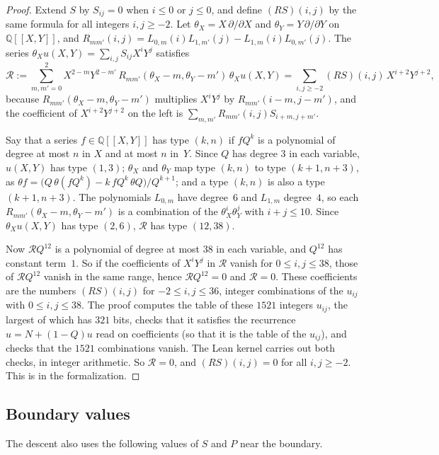 \documentclass[11pt]{amsart}
\theoremstyle{definition}
\numberwithin{equation}{section}
\newcommand{\Q}{\mathbb{Q}}
\begin{document}
\begin{proof}
Extend $S$ by $S_{ij}=0$ when $i\le0$ or $j\le0$, and define $(RS)(i,j)$ by the same formula for all integers $i,j\ge-2$. Let $\theta_X=X\,\partial/\partial X$ and $\theta_Y=Y\,\partial/\partial Y$ on $\Q[[X,Y]]$, and $R_{mm'}(i,j)=L_{0,m}(i)L_{1,m'}(j)-L_{1,m}(i)L_{0,m'}(j)$. The series $\theta_Xu(X,Y)=\sum_{i,j}S_{ij}X^iY^j$ satisfies
\[
\mathcal R:=\sum_{m,m'=0}^2X^{2-m}Y^{2-m'}\,R_{mm'}(\theta_X-m,\theta_Y-m')\,\theta_Xu(X,Y)=\sum_{i,j\ge-2}(RS)(i,j)\,X^{i+2}Y^{j+2},
\]
because $R_{mm'}(\theta_X-m,\theta_Y-m')$ multiplies $X^iY^j$ by $R_{mm'}(i-m,j-m')$, and the coefficient of $X^{i+2}Y^{j+2}$ on the left is $\sum_{m,m'}R_{mm'}(i,j)S_{i+m,j+m'}$.

Say that a series $f\in\Q[[X,Y]]$ has type $(k,n)$ if $fQ^k$ is a polynomial of degree at most $n$ in $X$ and at most $n$ in~$Y$. Since $Q$ has degree $3$ in each variable, $u(X,Y)$ has type $(1,3)$; $\theta_X$ and $\theta_Y$ map type $(k,n)$ to type $(k+1,n+3)$, as $\theta f=\bigl(Q\,\theta(fQ^k)-k\,fQ^k\,\theta Q\bigr)/Q^{k+1}$; and a type $(k,n)$ is also a type $(k+1,n+3)$. The polynomials $L_{0,m}$ have degree~$6$ and $L_{1,m}$ degree~$4$, so each $R_{mm'}(\theta_X-m,\theta_Y-m')$ is a combination of the $\theta_X^i\theta_Y^j$ with $i+j\le10$. Since $\theta_Xu(X,Y)$ has type $(2,6)$, $\mathcal R$ has type $(12,38)$.

Now $\mathcal RQ^{12}$ is a polynomial of degree at most $38$ in each variable, and $Q^{12}$ has constant term~$1$. So if the coefficients of $X^iY^j$ in $\mathcal R$ vanish for $0\le i,j\le38$, those of $\mathcal RQ^{12}$ vanish in the same range, hence $\mathcal RQ^{12}=0$ and $\mathcal R=0$. These coefficients are the numbers $(RS)(i,j)$ for $-2\le i,j\le36$, integer combinations of the $u_{ij}$ with $0\le i,j\le38$. The proof computes the table of these $1521$ integers $u_{ij}$, the largest of which has $321$ bits, checks that it satisfies the recurrence $u=N+(1-Q)u$ read on coefficients (so that it is the table of the $u_{ij}$), and checks that the $1521$ combinations vanish. The Lean kernel carries out both checks, in integer arithmetic. So $\mathcal R=0$, and $(RS)(i,j)=0$ for all $i,j\ge-2$. This is  in the formalization.
\end{proof}

\subsection{Boundary values}
The descent also uses the following values of $S$ and $P$ near the boundary.
\end{document}
